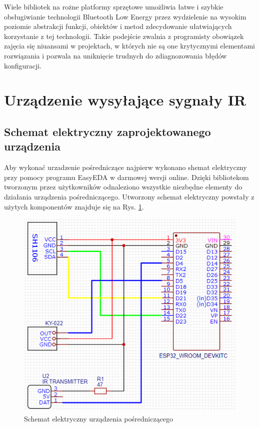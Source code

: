 \documentclass[12pt,twoside]{article}
\begin{document}
Wiele bibliotek na rożne platformy sprzętowe umożliwia łatwe i szybkie obsługiwianie technologii Bluetooth Low Energy przez wydzielenie na wysokim poziomie abstrakcji funkcji, obiektów i metod zdecydowanie ułatwiających korzystanie z tej technologii. Takie podejście zwalnia z programisty obowiązek zajęcia się niuansami w projektach, w których nie są one krytycznymi elementami rozwiązania i pozwala na uniknięcie trudnych do zdiagnozowania błędów konfiguracji.

\clearpage

\section{Urządzenie wysyłające sygnały IR}
\subsection{Schemat elektryczny zaprojektowanego urządzenia}
Aby wykonać urzadzenie pośredniczące najpierw wykonano shemat elektryczny przy pomocy programu EasyEDA w darmowej wersji online\cite{easyEda}. Dzięki bibliotekom tworzonym przez użytkowników odnaleziono wszystkie niezbędne elementy do działania urządzenia pośredniczącego. Utworzony schemat elektryczny powstały z użytych komponentów znajduje się na Rys. \ref*{Fig:deviceScheme}.
\begin{figure}[ht]
   \centering
   \includegraphics[width=12cm]{images/deviceScheme.png}
   \caption{Schemat elektryczny urządzenia pośredniczącego}
   \label{Fig:deviceScheme}
\end{figure}
\end{document}
